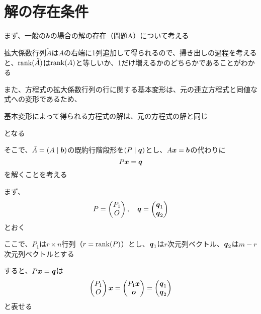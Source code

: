 \documentclass[../../../topic_linear-algebra]{subfiles}
\begin{document}
\sectionline
\section{解の存在条件}

まず、一般の$\vb*{b}$の場合の解の存在（問題A）について考える

\br

拡大係数行列$\tilde{A}$は$A$の右端に1列追加して得られるので、掃き出しの過程を考えると、$\rank(\tilde{A})$は$\rank(A)$と等しいか、1だけ増えるかのどちらかであることがわかる

\br

また、方程式の拡大係数行列の行に関する基本変形は、元の連立方程式と同値な式への変形であるため、
\begin{shaded}
  基本変形によって得られる方程式の解は、元の方程式の解と同じ
\end{shaded}
となる

\br

そこで、$\tilde{A} = (A \mid \vb*{b})$の既約行階段形を$(P \mid \vb*{q})$とし、$A\vb*{x} = \vb*{b}$の代わりに
\begin{equation*}
  P\vb*{x} = \vb*{q}
\end{equation*}
を解くことを考える

\br

まず、
\begin{equation*}
  P = \begin{pmatrix}
    P_1 \\
    O
  \end{pmatrix}, \quad
  \vb*{q} = \begin{pmatrix}
    \vb*{q}_1 \\
    \vb*{q}_2
  \end{pmatrix}
\end{equation*}
とおく

ここで、$P_1$は$r \times n$行列（$r = \rank(P)$）とし、$\vb*{q}_1$は$r$次元列ベクトル、$\vb*{q}_2$は$m - r$次元列ベクトルとする

\br

すると、$P\vb*{x} = \vb*{q}$は
\begin{equation*}
  \begin{pmatrix}
    P_1 \\
    O
  \end{pmatrix} \vb*{x}
  = \begin{pmatrix}
    P_1 \vb*{x} \\
    \vb*{o}
  \end{pmatrix}
  = \begin{pmatrix}
    \vb*{q}_1 \\
    \vb*{q}_2
  \end{pmatrix}
\end{equation*}
と表せる
\end{document}
